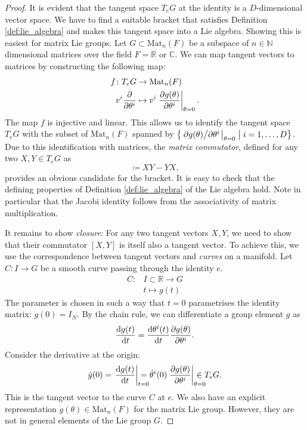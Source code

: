 \begin{proof}
  It is evident that the tangent space $T_e G$ at the identity is a $D$-dimensional vector space. 
  We have to find a suitable bracket that satisfies Definition \ref{def:lie_algebra} and makes this tangent space into a Lie algebra.
  Showing this is easiest for matrix Lie groups.
  Let $G \subset \text{Mat}_n (F)$ be a subspace of $n \in \mathbb{N}$ dimensional matrices over the field $F = \mathbb{R}$ or $\mathbb{C}$.
  We can map tangent vectors to matrices by constructing the following map:
  \begin{equation}
    \begin{split}
      f \colon T_e G &\to \text{Mat}_n(F) \\
      v^i \pdv{}{\theta^i} &\mapsto v^i \left.\pdv{g(\theta)}{\theta^i} \right\lvert_{\theta = 0}.
    \end{split}
  \end{equation}
  The map $f$ is injective and linear.
  This allows us to identify the tangent space $T_e G$ with the subset of $\text{Mat}_n(F)$ spanned by $ \left\{ \left. \pdv*{g(\theta)}{\theta^i}\right\rvert_{\theta = 0} \suchthat i = 1, \ldots, D \right\}$.
  Due to this identification with matrices, the \emph{matrix commutator}, defined for any two $X, Y \in T_e G$ as
  \begin{equation}
    [X, Y] \coloneqq XY - YX,
  \end{equation}
  provides an obvious candidate for the bracket.
  It is easy to check that the defining properties of Definition \ref{def:lie_algebra} of the Lie algebra hold.
  Note in particular that the Jacobi identity follows from the associativity of matrix multiplication.
  
  It remains to show \emph{closure}: For any two tangent vectors $X, Y$, we need to show that their commutator $[X, Y]$ is itself also a tangent vector.
  To achieve this, we use the correspondence between tangent vectors and \emph{curves} on a manifold.
  Let $C: I \to G$ be a smooth curve passing through the identity $e$.
  \begin{equation}
    \begin{split}
      C \colon &I \subset \mathbb{R} \to G \\
       &t \mapsto g(t)
    \end{split}
  \end{equation}
  The parameter is chosen in such a way that $t=0$ parametrises the identity matrix: $g(0) = I_N$.
  By the chain rule, we can differentiate a group element $g$ as
  \begin{equation}
    \dv{g(t)}{t} = \dv{\theta^i (t)}{t} \pdv{g(\theta)}{\theta^i}.
  \end{equation}
  Consider the derivative at the origin:
  \begin{equation}
    \dot g(0) = \left. \dv{g(t)}{t}\right\rvert_{\mathrlap{t=0}} = \dot \theta^i(0) \left.\pdv{g(\theta)}{\theta^i}\right\rvert_{\mathrlap{\theta = 0}} \in T_e  G.
  \end{equation}
  This is the tangent vector to the curve $C$ at $e$.
  We also have an explicit representation $\dot g(\theta) \in \text{Mat}_n (F)$ for the matrix Lie group. However, they are not in general elements of the Lie group $G$.


\end{proof}
